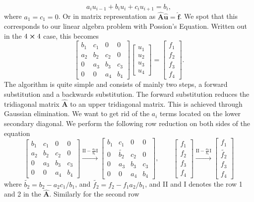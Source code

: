 \documentclass[a4paper,10pt]{article}
\begin{document}
\begin{equation}\label{eq:5}
a_i u_{i-1} + b_i u_i +c_i u_{i+1} = b_i,
\end{equation}
where $a_1 = c_1 = 0$. Or in matrix representation as $\mathbf{\hat{A}} \mathbf{\hat{u}} = \mathbf{\hat{f}}$. We spot that this corresponds to our linear algebra problem with Possion's Equation. Written out in the $4 \cross 4$ case, this becomes
\begin{equation}\label{eq:6}
\begin{bmatrix}
b_1 & c_1 & 0 & 0 \\
a_2& b_2 & c_2 & 0 \\
0 & a_3 & b_3 & c_3 \\
0 & 0 & a_4 & b_4 
\end{bmatrix}
\begin{bmatrix}
u_1 \\
u_2 \\
u_3 \\
u_4
\end{bmatrix}
=
\begin{bmatrix}
f_1\\
f_2\\
f_3\\
f_4
\end{bmatrix}.
\end{equation}
The algorithm is quite simple and consists of mainly two steps, a forward substitution and a backwards substitution. The forward substitution reduces the tridiagonal matrix $\mathbf{\hat{A}}$ to an upper tridiagonal matrix. This is achieved through Gaussian elimination. We want to get rid of the $a_i$ terms located on the lower secondary diagonal. We perform the following row reduction on both sides of the equation
\[
\begin{bmatrix}
b_1 & c_1 & 0 & 0 \\
a_2& b_2 & c_2 & 0 \\
0 & a_3 & b_3 & c_3 \\
0 & 0 & a_4 & b_4 
\end{bmatrix}
\xrightarrow{\text{II} - \frac{a_2}{b_1}\text{I}}
\begin{bmatrix}
b_1 & c_1 & 0 & 0 \\
0& \tilde{b_2}  & c_2 & 0 \\
0 & a_3 & b_3 & c_3 \\
0 & 0 & a_4 & b_4 
\end{bmatrix}, \qquad
\begin{bmatrix}
f_1\\
f_2\\
f_3\\
f_4
\end{bmatrix}
\xrightarrow{\text{II} - \frac{a_2}{b_1}\text{I}}
\begin{bmatrix}
f_1\\
\tilde{f_2}\\
f_3\\
f_4
\end{bmatrix}
\]
where $\tilde{b_2} = b_2 - a_2c_1/b_1$, and $\tilde{f_2} = f_2 - f_1a_2/b_1$, and II and I denotes the row 1 and 2 in the $\mathbf{\hat{A}}$. Similarly for the second row
\end{document}

